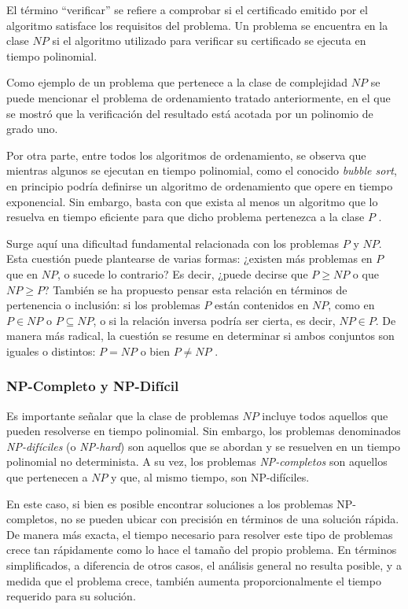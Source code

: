 \documentclass[12pt,titlepage,twoside,openright]{book}
\begin{document}
El término “verificar” se refiere a comprobar si el certificado emitido por el algoritmo satisface los requisitos del problema. Un problema se encuentra en la clase \(NP\) si el algoritmo utilizado para verificar su certificado se ejecuta en tiempo polinomial.

Como ejemplo de un problema que pertenece a la clase de complejidad \(NP\) se puede mencionar el problema de ordenamiento tratado anteriormente, en el que se mostró que la verificación del resultado está acotada por un polinomio de grado uno.

Por otra parte, entre todos los algoritmos de ordenamiento, se observa que mientras algunos se ejecutan en tiempo polinomial, como el conocido \emph{bubble sort}, en principio podría definirse un algoritmo de ordenamiento que opere en tiempo exponencial. Sin embargo, basta con que exista al menos un algoritmo que lo resuelva en tiempo eficiente para que dicho problema pertenezca a la clase \(P\) \citep{Flores2014}.

Surge aquí una dificultad fundamental relacionada con los problemas \(P\) y \(NP\). Esta cuestión puede plantearse de varias formas: ¿existen más problemas en \(P\) que en \(NP\), o sucede lo contrario? Es decir, ¿puede decirse que \(P \geq NP\) o que \(NP \geq P\)? También se ha propuesto pensar esta relación en términos de pertenencia o inclusión: si los problemas \(P\) están contenidos en \(NP\), como en \(P \in NP\) o \(P \subseteq NP\), o si la relación inversa podría ser cierta, es decir, \(NP \in P\). De manera más radical, la cuestión se resume en determinar si ambos conjuntos son iguales o distintos: \(P = NP\) o bien \(P \neq NP\) \citep{maldonado2013problema}.


\subsubsection{NP-Completo y NP-Difícil}

Es importante señalar que la clase de problemas \(NP\) incluye todos aquellos que pueden resolverse en tiempo polinomial. Sin embargo, los problemas denominados \emph{NP-difíciles} (o \emph{NP-hard}) son aquellos que se abordan y se resuelven en un tiempo polinomial no determinista. A su vez, los problemas \emph{NP-completos} son aquellos que pertenecen a \(NP\) y que, al mismo tiempo, son NP-difíciles.

En este caso, si bien es posible encontrar soluciones a los problemas NP-completos, no se pueden ubicar con precisión en términos de una solución rápida. De manera más exacta, el tiempo necesario para resolver este tipo de problemas crece tan rápidamente como lo hace el tamaño del propio problema. En términos simplificados, a diferencia de otros casos, el análisis general no resulta posible, y a medida que el problema crece, también aumenta proporcionalmente el tiempo requerido para su solución.
\end{document}
